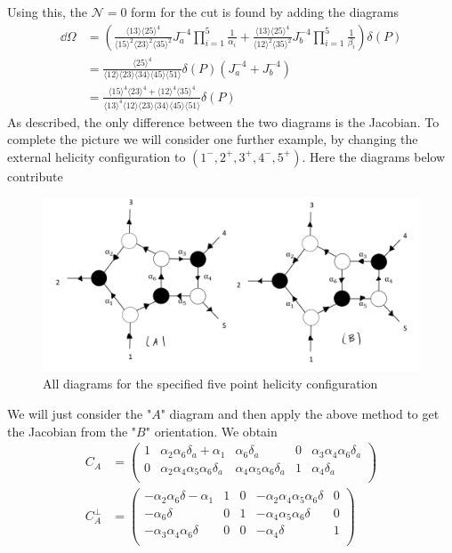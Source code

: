 \documentclass[letter,11pt]{article}
\newcommand{\ab}[1]{\langle #1 \rangle}
\begin{document}
Using this, the $\mathcal{N}=0$ form for the cut is found by adding the diagrams
\begin{equation}
	\begin{aligned}
		\dd\Omega
		&=\left(\frac{\ab{13}\ab{25}^4}{\ab{15}^2\ab{23}^2\ab{35}^2}J_a^{-4}\prod_{i=1}^{5}\frac{1}{\alpha_i}+\frac{\ab{13}\ab{25}^4}{\ab{12}^2\ab{35}^2}J_b^{-4}\prod_{i=1}^{5}\frac{1}{\beta_i}\right)\delta(P)\\
		&=\frac{\ab{25}^4}{\ab{12}\ab{23}\ab{34}\ab{45}\ab{51}}\delta(P)\left(J_a^{-4}+J_b^{-4}\right)\\
		&=\frac{\ab{15}^4\ab{23}^4+\ab{12}^4\ab{35}^4}{\ab{13}^4\ab{12}\ab{23}\ab{34}\ab{45}\ab{51}}\delta(P)
	\end{aligned}
\end{equation}
As described, the only difference between the two diagrams is the Jacobian. To complete the picture we will consider one further example, by changing the external helicity configuration to $(1^-,2^+,3^+,4^-,5^+)$. Here the diagrams below contribute
\begin{figure}[H]
	\centering
	\includegraphics[width=0.7\linewidth]{5pt4}
	\caption{All diagrams for the specified five point helicity configuration}
	\label{fig:5pt}
\end{figure}
\noindent We will just consider the "$A$" diagram and then apply the above method to get the Jacobian from the "$B$" orientation.
We obtain
\begin{equation}
	\begin{aligned}
		C_A&=\left(
		\begin{array}{ccccc}
			1 & \alpha _2 \alpha _6 \delta_a +\alpha _1 & \alpha _6 \delta_a  & 0 & \alpha _3 \alpha _4 \alpha _6 \delta_a  \\
			0 & \alpha _2 \alpha _4 \alpha _5 \alpha _6 \delta_a  & \alpha _4 \alpha _5 \alpha _6 \delta_a  & 1 & \alpha _4 \delta_a  \\
		\end{array}
		\right)\\
		C_A^\perp &=\left(
		\begin{array}{ccccc}
			-\alpha _2 \alpha _6 \delta -\alpha _1 & 1 & 0 & -\alpha _2 \alpha _4 \alpha _5 \alpha _6\delta & 0 \\
			-\alpha _6 \delta  & 0 & 1 & -\alpha _4 \alpha _5 \alpha _6 \delta & 0 \\
			-\alpha _3 \alpha _4 \alpha _6 \delta  & 0 & 0 & -\alpha _4 \delta & 1 \\
		\end{array}
		\right)
	\end{aligned}
\end{equation}
\end{document}
